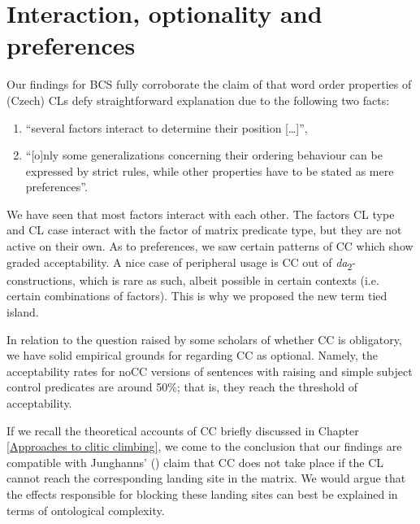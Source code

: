 \section{Interaction, optionality and preferences}
\label{Interaction, optionality an preferences}
Our findings for BCS fully corroborate the claim of \citet[][205]{Rosen01} that word order properties of (Czech) CLs defy straightforward explanation due to the following two facts: 

\begin{enumerate}
\item ``several factors interact to determine their position [\dots]”,
\item “[o]nly some generalizations concerning their ordering behaviour can be expressed by strict rules, while other properties have to be stated as mere preferences”. 
\end{enumerate}

We have seen that most factors interact with each other. The factors CL type and CL case interact with the factor of matrix predicate type, but they are not active on their own. As to preferences, we saw certain patterns of CC which show graded acceptability. A nice case of peripheral usage is CC out of \textit{da}\textsubscript{2}-constructions, which is rare as such, albeit possible in certain contexts (i.e. certain combinations of factors). This is why we proposed the new term tied island. 

In relation to the question raised by some scholars of whether CC is obligatory, we have solid empirical grounds for regarding CC as optional. Namely, the acceptability rates for noCC versions of sentences with raising and simple subject control predicates are around 50\%; that is, they reach the threshold of acceptability.

If we recall the theoretical accounts of CC briefly discussed in Chapter \ref{Approaches to clitic climbing}, we come to the conclusion that our findings are compatible with Junghanns’ (\citeyear[85f]{Junghanns02}) claim that CC does not take place if the CL cannot reach the corresponding landing site in the matrix. We would argue that the effects responsible for blocking these landing sites can best be explained in terms of ontological complexity. 

